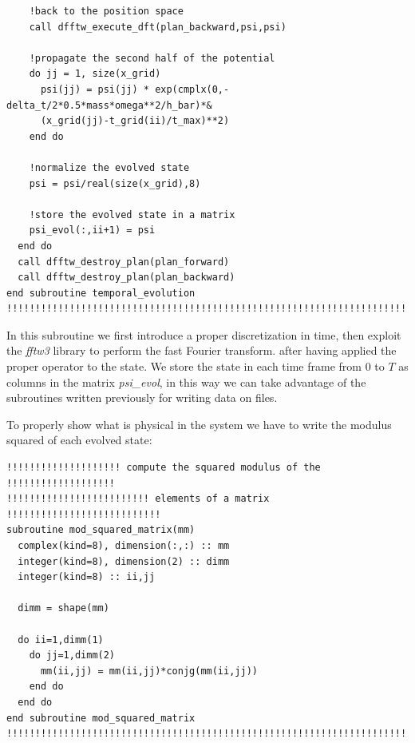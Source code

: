 \documentclass[prb,9pt,notitlepage]{revtex4-1}
\begin{document}
\begin{lstlisting}
    !back to the position space
    call dfftw_execute_dft(plan_backward,psi,psi)

    !propagate the second half of the potential
    do jj = 1, size(x_grid)
      psi(jj) = psi(jj) * exp(cmplx(0,-delta_t/2*0.5*mass*omega**2/h_bar)*&
      (x_grid(jj)-t_grid(ii)/t_max)**2)
    end do

    !normalize the evolved state
    psi = psi/real(size(x_grid),8)

    !store the evolved state in a matrix
    psi_evol(:,ii+1) = psi
  end do
  call dfftw_destroy_plan(plan_forward)
  call dfftw_destroy_plan(plan_backward)
end subroutine temporal_evolution
!!!!!!!!!!!!!!!!!!!!!!!!!!!!!!!!!!!!!!!!!!!!!!!!!!!!!!!!!!!!!!!!!!!!!!!!
\end{lstlisting}
In this subroutine we first introduce a proper discretization in time, then exploit the \textit{fftw3} library to perform the fast Fourier transform. after having applied the proper operator to the state. We store the state in each time frame from $0$ to $T$ as columns in the matrix \textit{psi\_evol}, in this way we can take advantage of the subroutines written previously for writing data on files.

To properly show what is physical in the system we have to write the modulus squared of each evolved state:
\begin{lstlisting}
!!!!!!!!!!!!!!!!!!!! compute the squared modulus of the  !!!!!!!!!!!!!!!!!!!
!!!!!!!!!!!!!!!!!!!!!!!!! elements of a matrix  !!!!!!!!!!!!!!!!!!!!!!!!!!!
subroutine mod_squared_matrix(mm)
  complex(kind=8), dimension(:,:) :: mm
  integer(kind=8), dimension(2) :: dimm
  integer(kind=8) :: ii,jj

  dimm = shape(mm)

  do ii=1,dimm(1)
    do jj=1,dimm(2)
      mm(ii,jj) = mm(ii,jj)*conjg(mm(ii,jj))
    end do
  end do
end subroutine mod_squared_matrix
!!!!!!!!!!!!!!!!!!!!!!!!!!!!!!!!!!!!!!!!!!!!!!!!!!!!!!!!!!!!!!!!!!!!!!!!
\end{lstlisting}
\end{document}
